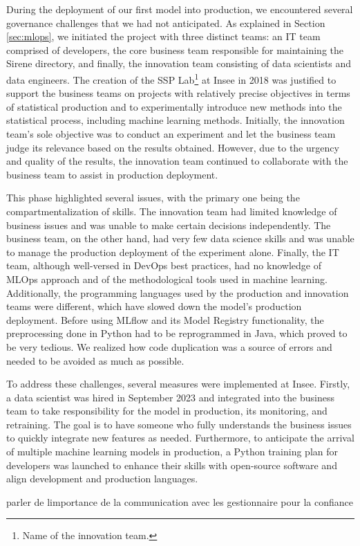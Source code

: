 During the deployment of our first model into production, we encountered several governance challenges that we had not anticipated. As explained in Section \ref{sec:mlops}, we initiated the project with three distinct teams: an IT team comprised of developers, the core business team responsible for maintaining the Sirene directory, and finally, the innovation team consisting of data scientists and data engineers. The creation of the SSP Lab\footnote{Name of the innovation team.} at Insee in 2018 was justified to support the business teams on projects with relatively precise objectives in terms of statistical production and to experimentally introduce new methods into the statistical process, including machine learning methods. Initially, the innovation team's sole objective was to conduct an experiment and let the business team judge its relevance based on the results obtained. However, due to the urgency and quality of the results, the innovation team continued to collaborate with the business team to assist in production deployment.

This phase highlighted several issues, with the primary one being the compartmentalization of skills. The innovation team had limited knowledge of business issues and was unable to make certain decisions independently. The business team, on the other hand, had very few data science skills and was unable to manage the production deployment of the experiment alone. Finally, the IT team, although well-versed in DevOps best practices, had no knowledge of MLOps approach and of the methodological tools used in machine learning. Additionally, the programming languages used by the production and innovation teams were different, which have slowed down the model's production deployment. Before using MLflow and its Model Registry functionality, the preprocessing done in Python had to be reprogrammed in Java, which proved to be very tedious. We realized how code duplication was a source of errors and needed to be avoided as much as possible.

To address these challenges, several measures were implemented at Insee. Firstly, a data scientist was hired in September 2023 and integrated into the business team to take responsibility for the model in production, its monitoring, and retraining. The goal is to have someone who fully understands the business issues to quickly integrate new features as needed. Furthermore, to anticipate the arrival of multiple machine learning models in production, a Python training plan for developers was launched to enhance their skills with open-source software and align development and production languages.


parler de limportance de la communication avec les gestionnaire pour la confiance
